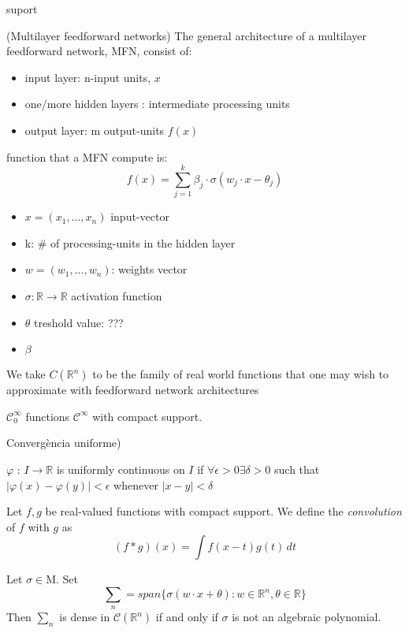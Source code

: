 \documentclass[../main.tex]{subfiles}
\begin{document}
\begin{definition} suport
	
\end{definition}
\begin{definition} (Multilayer feedforward networks) 
The general architecture of a multilayer feedforward network, MFN, consist of: 
\begin{itemize}
	\item input layer: n-input units, $x$
	\item one/more hidden layers : intermediate processing units 
	\item output layer: m output-units	 $f(x)$
\end{itemize} 

	
	function that a MFN compute is: 
	$$f(x)=\sum_{j=1}^k \beta_j \cdot \sigma(w_j \cdot x - \theta_j)$$
	
	\begin{itemize}
		\item $x = (x_1,...,x_n)$ input-vector
		\item k: $\#$ of processing-units in the hidden layer
		\item $w=(w_1,...,w_n)$:  weights vector
		\item $\sigma : \mathbb{R} \rightarrow \mathbb{R}$ activation function
		\item $\theta$ treshold value: ??? 
		\item $\beta$ 
	\end{itemize}
	
\end{definition}


We take $C(\mathbb{R}^n)$ to be the family of real world functions that one may wish to approximate with feedforward network architectures \\ 

	\begin{definition} 
	$ \mathcal{C}^\infty_0$ functions $\mathcal{C}^\infty$ with compact support.  
\end{definition}

\begin{definition} Convergència uniforme) 
\end{definition}

\begin{definition} 
	$\varphi$ : $I \rightarrow \mathbb{R}$ is uniformly continuous on $I$ if $\forall \epsilon > 0 \exists \delta >0 $ such that $|\varphi(x)- \varphi(y)| < \epsilon$ whenever $|x-y|< \delta$
\end{definition}

\begin{definition}
	Let $f,g$ be real-valued functions with compact support. We define the \emph{convolution} of $f$ with $g$ as $$(f\ast g)(x)=\int f(x-t)g(t) \, dt$$
\end{definition}

\begin{theorem} Let $ \sigma \in \text{M} $. Set
	$$ \sum_n = span\{\sigma(w\cdot x + \theta) : w\in \mathbb{R}^n, \theta \in \mathbb{R} \}$$
	Then $\sum_n$ is dense in $\mathcal{C}(\mathbb{R}^n)$ if and only if $\sigma$ is not an algebraic polynomial. \\ 
\end{theorem}
\end{document}
